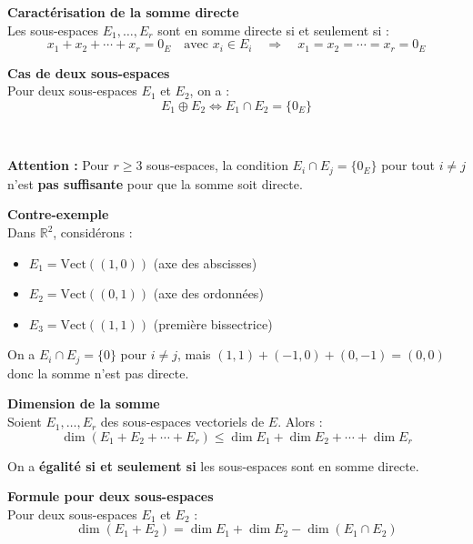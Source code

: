 \documentclass[../PolyS4.tex]{subfiles}
\begin{document}
\begin{Prop}\textbf{Caractérisation de la somme directe}\\

Les sous-espaces $E_1, \ldots, E_r$ sont en somme directe si et seulement si :
$$x_1 + x_2 + \cdots + x_r = 0_E \quad \text{avec } x_i \in E_i \quad \Longrightarrow \quad x_1 = x_2 = \cdots = x_r = 0_E$$
\end{Prop}

\begin{Prop}\textbf{Cas de deux sous-espaces}\\

Pour deux sous-espaces $E_1$ et $E_2$, on a :
$$E_1 \oplus E_2 \Longleftrightarrow E_1 \cap E_2 = \{0_E\}$$
\end{Prop}

\begin{Rmq}$\,$

\textbf{Attention :} Pour $r \geq 3$ sous-espaces, la condition $E_i \cap E_j = \{0_E\}$ pour tout $i \neq j$ n'est \textbf{pas suffisante} pour que la somme soit directe.
\end{Rmq}

\begin{Ex}\textbf{Contre-exemple}\\

Dans $\mathbb{R}^2$, considérons :
\begin{itemize}
    \item $E_1 = \text{Vect}((1, 0))$ (axe des abscisses)
    \item $E_2 = \text{Vect}((0, 1))$ (axe des ordonnées)
    \item $E_3 = \text{Vect}((1, 1))$ (première bissectrice)
\end{itemize}
On a $E_i \cap E_j = \{0\}$ pour $i \neq j$, mais $(1,1) + (-1,0) + (0,-1) = (0,0)$ donc la somme n'est pas directe.
\end{Ex}

\begin{Thm}\textbf{Dimension de la somme}\\

Soient $E_1, \ldots, E_r$ des sous-espaces vectoriels de $E$. Alors :
$$\dim(E_1 + E_2 + \cdots + E_r) \leq \dim E_1 + \dim E_2 + \cdots + \dim E_r$$

On a \textbf{égalité si et seulement si} les sous-espaces sont en somme directe.
\end{Thm}

\begin{Prop}\textbf{Formule pour deux sous-espaces}\\

Pour deux sous-espaces $E_1$ et $E_2$ :
$$\dim(E_1 + E_2) = \dim E_1 + \dim E_2 - \dim(E_1 \cap E_2)$$
\end{Prop}
\end{document}
